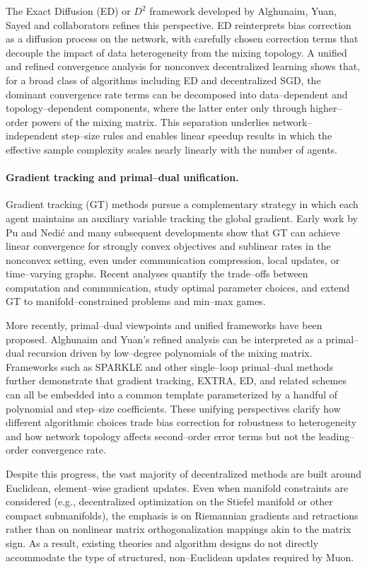 The Exact Diffusion (ED) or $D^2$ framework developed by Alghunaim, Yuan, Sayed and collaborators refines this perspective. ED reinterprets bias correction as a diffusion process on the network, with carefully chosen correction terms that decouple the impact of data heterogeneity from the mixing topology. A unified and refined convergence analysis for nonconvex decentralized learning shows that, for a broad class of algorithms including ED and decentralized SGD, the dominant convergence rate terms can be decomposed into data–dependent and topology–dependent components, where the latter enter only through higher–order powers of the mixing matrix. This separation underlies network–independent step–size rules and enables linear speedup results in which the effective sample complexity scales nearly linearly with the number of agents.

\paragraph{Gradient tracking and primal–dual unification.}
Gradient tracking (GT) methods pursue a complementary strategy in which each agent maintains an auxiliary variable tracking the global gradient. Early work by Pu and Nedi\'c and many subsequent developments show that GT can achieve linear convergence for strongly convex objectives and sublinear rates in the nonconvex setting, even under communication compression, local updates, or time–varying graphs. Recent analyses quantify the trade–offs between computation and communication, study optimal parameter choices, and extend GT to manifold–constrained problems and min–max games.

More recently, primal–dual viewpoints and unified frameworks have been proposed. Alghunaim and Yuan's refined analysis can be interpreted as a primal–dual recursion driven by low–degree polynomials of the mixing matrix. Frameworks such as SPARKLE and other single–loop primal–dual methods further demonstrate that gradient tracking, EXTRA, ED, and related schemes can all be embedded into a common template parameterized by a handful of polynomial and step–size coefficients. These unifying perspectives clarify how different algorithmic choices trade bias correction for robustness to heterogeneity and how network topology affects second–order error terms but not the leading–order convergence rate.

Despite this progress, the vast majority of decentralized methods are built around Euclidean, element–wise gradient updates. Even when manifold constraints are considered (e.g., decentralized optimization on the Stiefel manifold or other compact submanifolds), the emphasis is on Riemannian gradients and retractions rather than on nonlinear matrix orthogonalization mappings akin to the matrix sign. As a result, existing theories and algorithm designs do not directly accommodate the type of structured, non–Euclidean updates required by Muon.

